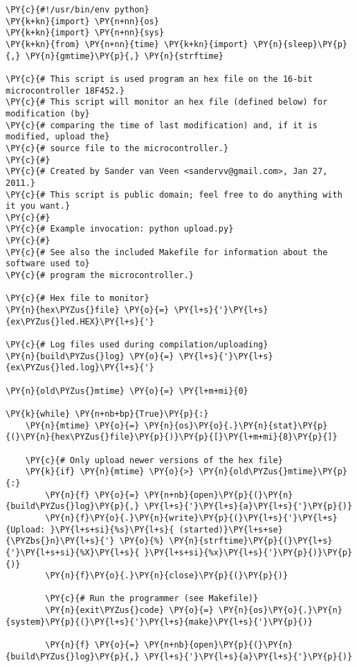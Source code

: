 \begin{Verbatim}[commandchars=\\\{\}]
\PY{c}{#!/usr/bin/env python}
\PY{k+kn}{import} \PY{n+nn}{os}
\PY{k+kn}{import} \PY{n+nn}{sys}
\PY{k+kn}{from} \PY{n+nn}{time} \PY{k+kn}{import} \PY{n}{sleep}\PY{p}{,} \PY{n}{gmtime}\PY{p}{,} \PY{n}{strftime}

\PY{c}{# This script is used program an hex file on the 16-bit microcontroller 18F452.}
\PY{c}{# This script will monitor an hex file (defined below) for modification (by}
\PY{c}{# comparing the time of last modification) and, if it is modified, upload the}
\PY{c}{# source file to the microcontroller.}
\PY{c}{#}
\PY{c}{# Created by Sander van Veen <sandervv@gmail.com>, Jan 27, 2011.}
\PY{c}{# This script is public domain; feel free to do anything with it you want.}
\PY{c}{#}
\PY{c}{# Example invocation: python upload.py}
\PY{c}{#}
\PY{c}{# See also the included Makefile for information about the software used to}
\PY{c}{# program the microcontroller.}

\PY{c}{# Hex file to monitor}
\PY{n}{hex\PYZus{}file} \PY{o}{=} \PY{l+s}{'}\PY{l+s}{ex\PYZus{}led.HEX}\PY{l+s}{'}

\PY{c}{# Log files used during compilation/uploading}
\PY{n}{build\PYZus{}log} \PY{o}{=} \PY{l+s}{'}\PY{l+s}{ex\PYZus{}led.log}\PY{l+s}{'}

\PY{n}{old\PYZus{}mtime} \PY{o}{=} \PY{l+m+mi}{0}

\PY{k}{while} \PY{n+nb+bp}{True}\PY{p}{:}
    \PY{n}{mtime} \PY{o}{=} \PY{n}{os}\PY{o}{.}\PY{n}{stat}\PY{p}{(}\PY{n}{hex\PYZus{}file}\PY{p}{)}\PY{p}{[}\PY{l+m+mi}{8}\PY{p}{]}

    \PY{c}{# Only upload newer versions of the hex file}
    \PY{k}{if} \PY{n}{mtime} \PY{o}{>} \PY{n}{old\PYZus{}mtime}\PY{p}{:}
        \PY{n}{f} \PY{o}{=} \PY{n+nb}{open}\PY{p}{(}\PY{n}{build\PYZus{}log}\PY{p}{,} \PY{l+s}{'}\PY{l+s}{a}\PY{l+s}{'}\PY{p}{)}
        \PY{n}{f}\PY{o}{.}\PY{n}{write}\PY{p}{(}\PY{l+s}{'}\PY{l+s}{Upload: }\PY{l+s+si}{%s}\PY{l+s}{ (started)}\PY{l+s+se}{\PYZbs{}n}\PY{l+s}{'} \PY{o}{%} \PY{n}{strftime}\PY{p}{(}\PY{l+s}{'}\PY{l+s+si}{%X}\PY{l+s}{ }\PY{l+s+si}{%x}\PY{l+s}{'}\PY{p}{)}\PY{p}{)}
        \PY{n}{f}\PY{o}{.}\PY{n}{close}\PY{p}{(}\PY{p}{)}

        \PY{c}{# Run the programmer (see Makefile)}
        \PY{n}{exit\PYZus{}code} \PY{o}{=} \PY{n}{os}\PY{o}{.}\PY{n}{system}\PY{p}{(}\PY{l+s}{'}\PY{l+s}{make}\PY{l+s}{'}\PY{p}{)}

        \PY{n}{f} \PY{o}{=} \PY{n+nb}{open}\PY{p}{(}\PY{n}{build\PYZus{}log}\PY{p}{,} \PY{l+s}{'}\PY{l+s}{a}\PY{l+s}{'}\PY{p}{)}


\end{Verbatim}
